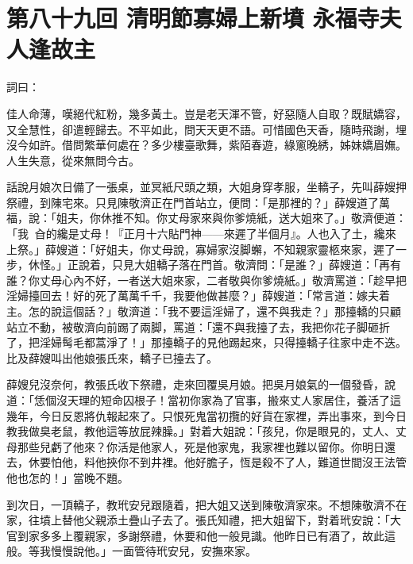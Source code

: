 
\chapter*{第八十九回 清明節寡婦上新墳 永福寺夫人逢故主}


詞曰：

\begin{myquote}
佳人命薄，嘆絕代紅粉，幾多黃土。豈是老天渾不管，好惡隨人自取？既賦嬌容，又全慧性，卻遣輕歸去。不平如此，問天天更不語。可惜國色天香，隨時飛謝，埋沒今如許。借問繁華何處在？多少樓臺歌舞，紫陌春遊，綠窻晚綉，姊妹嬌眉嫵。人生失意，從來無問今古。

\end{myquote}

話說月娘次日備了一張桌，並冥紙尺頭之類，大姐身穿孝服，坐轎子，先叫薛嫂押祭禮，到陳宅來。只見陳敬濟正在門首站立，便問：「是那裡的？」薛嫂道了萬福，說：「姐夫，你休推不知。你丈母家來與你爹燒紙，送大姐來了。」{}敬濟便道：「我𩫻𩫵㒲的纔是丈母！{}『正月十六貼門神——來遲了半個月』。人也入了土，纔來上祭。」薛嫂道：「好姐夫，你丈母說，寡婦家沒脚蠏，不知親家靈柩來家，遲了一步，休怪。」正說着，只見大姐轎子落在門首。敬濟問：「是誰？」薛嫂道：「再有誰？你丈母心內不好，一者送大姐來家，二者敬與你爹燒紙。」敬濟罵道：「趁早把淫婦擡回去！好的死了萬萬千千，我要他做甚麼？」{}薛嫂道：「常言道：嫁夫着主。怎的說這個話？」敬濟道：「我不要這淫婦了，還不與我走？」那擡轎的只顧站立不動，被敬濟向前踢了兩脚，罵道：「還不與我擡了去，我把你花子脚砸折了，把淫婦髩毛都蒿淨了！」那擡轎子的見他踢起來，只得擡轎子往家中走不迭。比及薛嫂叫出他娘張氏來，轎子已擡去了。

薛嫂兒沒奈何，教張氏收下祭禮，走來回覆吳月娘。把吳月娘氣的一個發昏，說道：「恁個沒天理的短命囚根子！當初你家為了官事，搬來丈人家居住，養活了這幾年，今日反恩將仇報起來了。只恨死鬼當初攬的好貨在家裡，弄出事來，到今日教我做臭老鼠，教他這等放屁辣臊。」{}對着大姐說：「孩兒，你是眼見的，丈人、丈母那些兒虧了他來？你活是他家人，死是他家鬼，我家裡也難以留你。你明日還去，休要怕他，料他挾你不到井裡。他好膽子，恆是殺不了人，{}難道世間沒王法管他也怎的！」當晚不題。

到次日，一頂轎子，教玳安兒跟隨着，把大姐又送到陳敬濟家來。不想陳敬濟不在家，往墳上替他父親添土疊山子去了。張氏知禮，把大姐留下，對着玳安說：「大官到家多多上覆親家，多謝祭禮，休要和他一般見識。他昨日已有酒了，故此這般。等我慢慢說他。」一面管待玳安兒，安撫來家。

